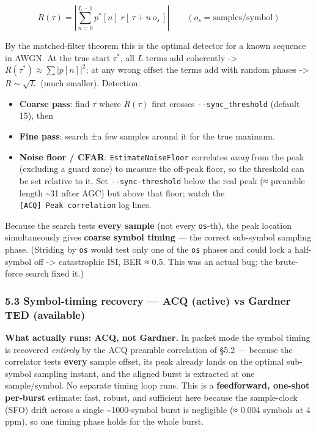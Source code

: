 \documentclass[
  10pt,
]{article}
\providecommand{\tightlist}{%
  \setlength{\itemsep}{0pt}\setlength{\parskip}{0pt}}
\begin{document}
\[ R(\tau) = \left| \sum_{n=0}^{L-1} p^{*}[n]\; r[\,\tau + n\,o_s\,] \right|
\qquad (o_s = \text{samples/symbol}) \]

By the matched-filter theorem this is the optimal detector for a known
sequence in AWGN. At the true start \(\tau^{*}\), all \(L\) terms add
coherently -\textgreater{} \(R(\tau^{*}) \approx \sum|p[n]|^2\); at any
wrong offset the terms add with random phases -\textgreater{}
\(R \sim \sqrt{L}\) (much smaller). Detection:

\begin{itemize}
\tightlist
\item
  \textbf{Coarse pass}: find \(\tau\) where \(R(\tau)\) first crosses
  \texttt{-\/-sync\_threshold} (default 15), then
\item
  \textbf{Fine pass}: search ±a few samples around it for the true
  maximum.
\item
  \textbf{Noise floor / CFAR}: \texttt{EstimateNoiseFloor} correlates
  \emph{away} from the peak (excluding a guard zone) to measure the
  off-peak floor, so the threshold can be set relative to it. Set
  \texttt{-\/-sync-threshold} below the real peak (≈ preamble length
  \textasciitilde31 after AGC) but above that floor; watch the
  \texttt{{[}ACQ{]}\ Peak\ correlation} log lines.
\end{itemize}

Because the search tests \textbf{every sample} (not every
\texttt{os}-th), the peak location simultaneously gives \textbf{coarse
symbol timing} --- the correct sub-symbol sampling phase. (Striding by
\texttt{os} would test only one of the \texttt{os} phases and could lock
a half-symbol off -\textgreater{} catastrophic ISI, BER ≈ 0.5. This was
an actual bug; the brute-force search fixed it.)

\hypertarget{53-symbol-timing-recovery--acq-active-vs-gardner-ted-available}{%
\subsubsection{5.3 Symbol-timing recovery --- ACQ (active) vs Gardner
TED
(available)}\label{53-symbol-timing-recovery--acq-active-vs-gardner-ted-available}}

\textbf{What actually runs: ACQ, not Gardner.} In packet mode the symbol
timing is recovered \emph{entirely} by the ACQ preamble correlation of
§5.2 --- because the correlator tests \textbf{every} sample offset, its
peak already lands on the optimal sub-symbol sampling instant, and the
aligned burst is extracted at one sample/symbol. No separate timing loop
runs. This is a \textbf{feedforward, one-shot per-burst} estimate: fast,
robust, and sufficient here because the sample-clock (SFO) drift across
a single \textasciitilde1000-symbol burst is negligible (≈ 0.004 symbols
at 4 ppm), so one timing phase holds for the whole burst.
\end{document}
